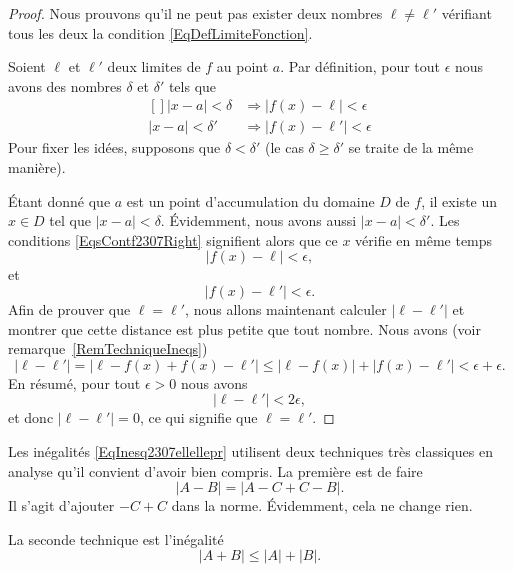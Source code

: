 \begin{proof}
	Nous prouvons qu'il ne peut pas exister deux nombres \( \ell\neq\ell'\) vérifiant tous les deux la condition \eqref{EqDefLimiteFonction}.

	Soient \( \ell\) et \( \ell'\) deux limites de \( f\) au point \( a\). Par définition, pour tout \( \epsilon\) nous avons des nombres \( \delta\) et \( \delta'\) tels que
	\begin{equation}	\label{EqsContf2307Right}
		\begin{aligned}[]
			| x-a |<\delta  & \Rightarrow \big| f(x)-\ell \big|<\epsilon        \\
			| x-a |<\delta' & \Rightarrow \big| f(x)-\ell' \big|<\epsilon
		\end{aligned}
	\end{equation}
	Pour fixer les idées, supposons que \( \delta<\delta'\) (le cas \( \delta\geq\delta'\) se traite de la même manière).

	Étant donné que \( a\) est un point d'accumulation du domaine \( D\) de \( f\), il existe un \( x\in D\) tel que \( | x-a |<\delta\). Évidemment, nous avons aussi \( | x-a |<\delta'\). Les conditions \eqref{EqsContf2307Right} signifient alors que ce \( x\) vérifie en même temps
	\begin{equation}
		| f(x)-\ell |<\epsilon,
	\end{equation}
	et
	\begin{equation}
		| f(x)-\ell' |<\epsilon.
	\end{equation}
	Afin de prouver que \( \ell=\ell'\), nous allons maintenant calculer \( | \ell-\ell' |\) et montrer que cette distance est plus petite que tout nombre. Nous avons (voir remarque~\ref{RemTechniqueIneqs})
	\begin{equation}	\label{EqInesq2307ellellepr}
		| \ell-\ell' |=| \ell-f(x)+f(x)-\ell' |\leq | \ell-f(x) |+| f(x)-\ell' |<\epsilon+\epsilon.
	\end{equation}
	En résumé, pour tout \( \epsilon>0\) nous avons
	\begin{equation}
		| \ell-\ell' |<2\epsilon,
	\end{equation}
	et donc \( | \ell-\ell' |=0\), ce qui signifie que \( \ell=\ell'\).
\end{proof}

\begin{remark}		\label{RemTechniqueIneqs}
	Les inégalités \eqref{EqInesq2307ellellepr} utilisent deux techniques très classiques en analyse qu'il convient d'avoir bien compris. La première est de faire
	\begin{equation}
		| A-B |=| A-C+C-B |.
	\end{equation}
	Il s'agit d'ajouter \( -C+C\) dans la norme. Évidemment, cela ne change rien.

	La seconde technique est l'inégalité
	\begin{equation}
		| A+B |\leq| A |+| B |.
	\end{equation}
\end{remark}

